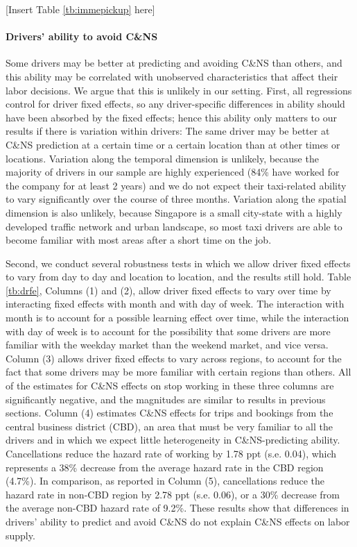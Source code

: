 \documentclass[reviewmode]{restud}
\begin{document}
\begin{center}
    [Insert Table \ref{tb:immepickup} here]
\end{center}

\paragraph{Drivers' ability to avoid C\&NS} Some drivers may be better at predicting and avoiding C\&NS than others, and this ability may be correlated with unobserved characteristics that affect their labor decisions. We argue that this is unlikely in our setting. First, all regressions control for driver fixed effects, so any driver-specific differences in ability should have been absorbed by the fixed effects; hence this ability only matters to our results if there is variation within drivers: The same driver may be better at C\&NS prediction at a certain time or a certain location than at other times or locations. Variation along the temporal dimension is unlikely, because the majority of drivers in our sample are highly experienced (84\% have worked for the company for at least 2 years) and we do not expect their taxi-related ability to vary significantly over the course of three months. Variation along the spatial dimension is also unlikely, because Singapore is a small city-state with a highly developed traffic network and urban landscape, so most taxi drivers are able to become familiar with most areas after a short time on the job. 

Second, we conduct several robustness tests in which we allow driver fixed effects to vary from day to day and location to location, and the results still hold. Table  \ref{tb:drfe}, Columns (1) and (2), allow driver fixed effects to vary over time by interacting fixed effects with month and with day of week. The interaction with month is to account for a possible learning effect over time, while the interaction with day of week is to account for the possibility that some drivers are more familiar with the weekday market than the weekend market, and vice versa. Column (3) allows driver fixed effects to vary across regions, to account for the fact that some drivers may be more familiar with certain regions than others. All of the estimates for C\&NS effects on stop working in these three columns are significantly negative, and the magnitudes are similar to results in previous sections. Column (4) estimates C\&NS effects for trips and bookings from the central business district (CBD), an area that must be very familiar to all the drivers and in which we expect little heterogeneity in C\&NS-predicting ability. Cancellations reduce the hazard rate of working by 1.78 ppt (s.e. 0.04), which represents a 38\% decrease from the average hazard rate in the CBD region (4.7\%). In comparison, as reported in Column (5), cancellations reduce the hazard rate in non-CBD region by 2.78 ppt (s.e. 0.06), or a 30\% decrease from the average non-CBD hazard rate of 9.2\%. These results show that differences in drivers' ability to predict and avoid C\&NS do not explain C\&NS effects on labor supply.
\end{document}
